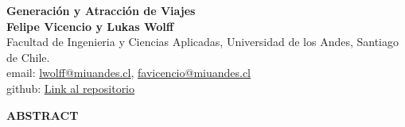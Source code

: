 \documentclass[12pt]{article} %
\begin{document}
\begin{titlepage}%
\newcommand{\HRule}{\rule{\linewidth}{0.5mm}} 
\center 
\begin{center}
    \textbf{\LARGE Generación y Atracción de Viajes} \\[0.5cm]
    \textbf{Felipe Vicencio y Lukas Wolff} \\
    Facultad de Ingenieria y Ciencias Aplicadas, Universidad de los Andes, Santiago de Chile.\\
    email: \href{mailto:lwolff@miuandes.cl}{lwolff@miuandes.cl}, \href{mailto:favicencio@miuandes.cl}{favicencio@miuandes.cl}
    \\
    github: \href{https://github.com/LukasWolff2002/TAREA_2_AUTITOS.git}{Link al repositorio}
\end{center}

\vspace{1cm}

\begin{center}
    \textbf{\large ABSTRACT}    
\end{center}


\end{titlepage}
\end{document}
